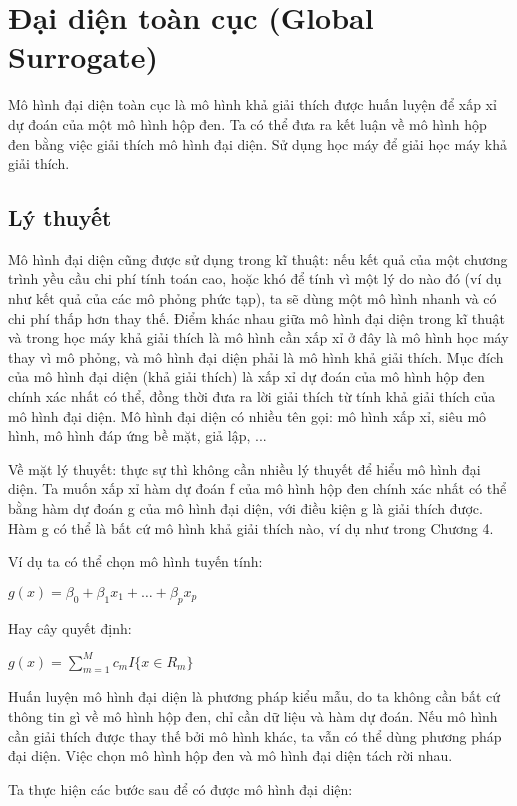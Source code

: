 \clearpage
\section{Đại diện toàn cục (Global Surrogate)}
Mô hình đại diện toàn cục là mô hình khả giải thích được huấn luyện để xấp xỉ dự đoán của một mô hình hộp đen. Ta có thể đưa ra kết luận về mô hình hộp đen bằng việc giải thích mô hình đại diện. Sử dụng học máy để giải học máy khả giải thích.
\subsection{Lý thuyết}
Mô hình đại diện cũng được sử dụng trong kĩ thuật: nếu kết quả của một chương trình yều cầu chi phí tính toán cao, hoặc khó để tính vì một lý do nào đó (ví dụ như kết quả của các mô phỏng phức tạp), ta sẽ dùng một mô hình nhanh và có chi phí thấp hơn thay thế. Điểm khác nhau giữa mô hình đại diện trong kĩ thuật và trong học máy khả giải thích là mô hình cần xấp xỉ ở đây là mô hình học máy thay vì mô phỏng, và mô hình đại diện phải là mô hình khả giải thích. Mục đích của mô hình đại diện (khả giải thích) là xấp xỉ dự đoán của mô hình hộp đen chính xác nhất có thể, đồng thời đưa ra lời giải thích từ tính khả giải thích của mô hình đại diện. Mô hình đại diện có nhiều tên gọi: mô hình xấp xỉ, siêu mô hình, mô hình đáp ứng bề mặt, giả lập, ...

Về mặt lý thuyết: thực sự thì không cần nhiều lý thuyết để hiểu mô hình đại diện. Ta muốn xấp xỉ hàm dự đoán f của mô hình hộp đen chính xác nhất có thể bằng hàm dự đoán g của mô hình đại diện, với điều kiện g là giải thích được. Hàm g có thể là bất cứ mô hình khả giải thích nào, ví dụ như trong Chương 4.

Ví dụ ta có thể chọn mô hình tuyến tính:
\begin{center}
    $g(x)=\beta_0+\beta_1{}x_1{}+\ldots+\beta_p{}x_p$
\end{center}

Hay cây quyết định:
\begin{center}
    $g(x)=\sum_{m=1}^Mc_m{}I\{x\in{}R_m\}$
\end{center}

Huấn luyện mô hình đại diện là phương pháp kiểu mẫu, do ta không cần bất cứ thông tin gì về mô hình hộp đen, chỉ cần dữ liệu và hàm dự đoán. Nếu mô hình cần giải thích được thay thế bởi mô hình khác, ta vẫn có thể dùng phương pháp đại diện. Việc chọn mô hình hộp đen và mô hình đại diện tách rời nhau.

Ta thực hiện các bước sau để có được mô hình đại diện:

